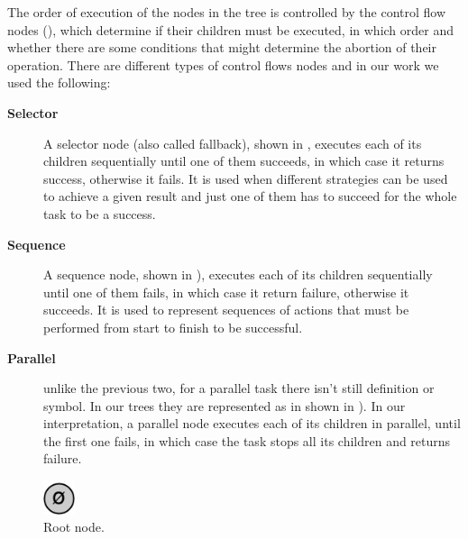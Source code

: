 The order of execution of the nodes in the tree is controlled by the control flow nodes (), which determine if their children must be executed, in which order and whether there are some conditions that might determine the abortion of their operation.
There are different types of control flows nodes and in our work we used the following:
\begin{description}
\item[\textbf{Selector}] A selector node (also called fallback), shown in , executes each of its children sequentially until one of them succeeds, in which case it returns success, otherwise it fails. It is used when different strategies can be used to achieve a given result and just one of them has to succeed for the whole task to be a success.
\item[\textbf{Sequence}] A sequence node, shown in ), executes each of its children sequentially until one of them fails, in which case it return failure, otherwise it succeeds. It is used to represent sequences of actions that must be performed from start to finish to be successful.
\item[\textbf{Parallel}] unlike the previous two, for a parallel task there isn’t still definition or symbol. In our trees they are represented as in shown in ). In our interpretation, a parallel node executes each of its children in parallel, until the first one fails, in which case the task stops all its children and returns failure. 
\end{description}

\begin{figure}[ht]
\centering
\includegraphics[height=1cm]{Images/images/bt/root.drawio.png} 
\caption{Root node.}
\label{fig:begin_bt_nodes}
\end{figure}

